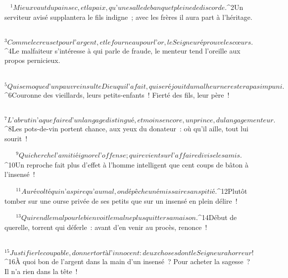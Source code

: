          
      \bchapter{}
${}^{1}Mieux vaut du pain sec, et la paix,
        qu’une salle de banquet pleine de discorde.
        
           
         
${}^{2}Un serviteur avisé supplantera le fils indigne ;
        avec les frères il aura part à l’héritage.
        
           
         
${}^{3}Comme le creuset pour l’argent, et le fourneau pour l’or,
        le Seigneur éprouve les cœurs.
        
           
         
${}^{4}Le malfaiteur s’intéresse à qui parle de fraude,
        le menteur tend l’oreille aux propos pernicieux.
        
           
         
${}^{5}Qui se moque d’un pauvre insulte Dieu qui l’a fait,
        qui se réjouit du malheur ne restera pas impuni.
        
           
         
${}^{6}Couronne des vieillards, leurs petits-enfants !
        Fierté des fils, leur père !
        
           
         
${}^{7}L’abruti n’a que faire d’un langage distingué,
        et moins encore, un prince, du langage menteur.
        
           
         
${}^{8}Les pots-de-vin portent chance, aux yeux du donateur :
        où qu’il aille, tout lui sourit !
        
           
         
${}^{9}Qui cherche l’amitié ignore l’offense ;
        qui revient sur l’affaire divise les amis.
        
           
         
${}^{10}Un reproche fait plus d’effet à l’homme intelligent
        que cent coups de bâton à l’insensé !
        
           
         
${}^{11}Au révolté qui n’aspire qu’au mal,
        on dépêche un émissaire sans pitié.
        
           
         
${}^{12}Plutôt tomber sur une ourse privée de ses petits
        que sur un insensé en plein délire !
        
           
         
${}^{13}Qui rend le mal pour le bien
        voit le mal ne plus quitter sa maison.
        
           
         
${}^{14}Début de querelle, torrent qui déferle :
        avant d’en venir au procès, renonce !
        
           
         
${}^{15}Justifier le coupable, donner tort à l’innocent :
        deux choses dont le Seigneur a horreur !
        
           
         
${}^{16}À quoi bon de l’argent dans la main d’un insensé ?
        Pour acheter la sagesse ? Il n’a rien dans la tête !
        
